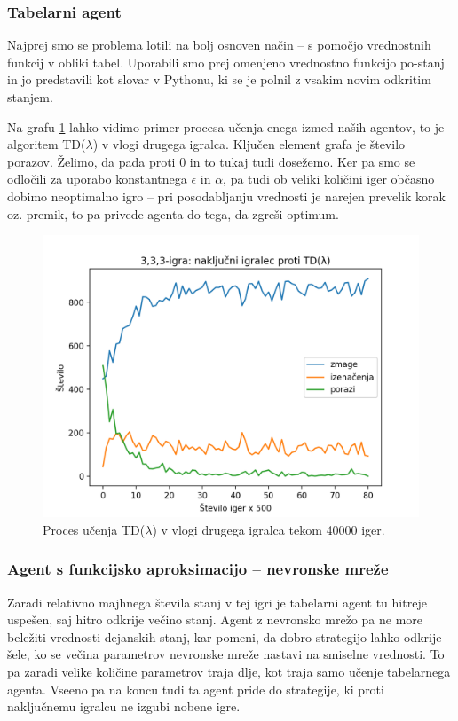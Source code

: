 \documentclass[12pt,a4paper]{amsart}
\theoremstyle{definition} %
\theoremstyle{plain} %
\begin{document}
\subsubsection{Tabelarni agent}
Najprej smo se problema lotili na bolj osnoven način -- s pomočjo vrednostnih funkcij v obliki tabel. 
Uporabili smo prej omenjeno vrednostno funkcijo po-stanj in jo predstavili kot slovar v Pythonu, ki 
se je polnil z vsakim novim odkritim stanjem.

Na grafu \ref{graf:1} lahko vidimo primer procesa učenja enega izmed naših agentov, to je algoritem 
TD($\lambda$) v vlogi drugega igralca. Ključen element grafa je število porazov. Želimo, da pada 
proti $0$ in to tukaj tudi dosežemo. Ker pa smo se odločili za uporabo konstantnega $\epsilon$ in 
$\alpha$, pa tudi ob veliki količini iger občasno dobimo neoptimalno igro -- pri posodabljanju 
vrednosti je narejen prevelik korak oz. premik, to pa privede agenta do tega, da zgreši optimum.

\begin{figure}[H]
    \includegraphics[scale=0.715]{../rezultati/tdl-333-40000-2.png}
    \caption{Proces učenja TD($\lambda$) v vlogi drugega igralca tekom 40000 iger.}
    \label{graf:1}
\end{figure}

\subsubsection{Agent s funkcijsko aproksimacijo -- nevronske mreže}
Zaradi relativno majhnega števila stanj v tej igri je tabelarni agent tu hitreje uspešen, saj hitro 
odkrije večino stanj. Agent z nevronsko mrežo pa ne more beležiti vrednosti dejanskih stanj, kar pomeni, 
da dobro strategijo lahko odkrije šele, ko se večina parametrov nevronske mreže nastavi na smiselne 
vrednosti. To pa zaradi velike količine parametrov traja dlje, kot traja samo učenje tabelarnega agenta.
Vseeno pa na koncu tudi ta agent pride do strategije, ki proti naključnemu igralcu ne izgubi nobene igre.
\end{document}
